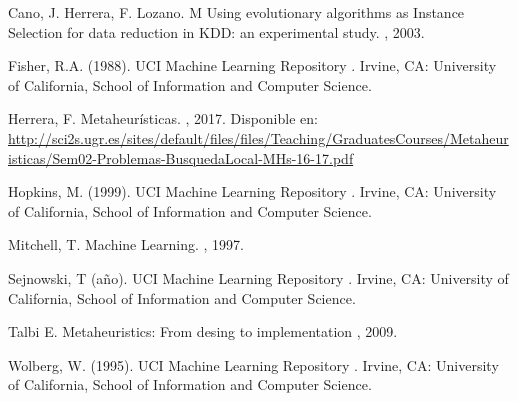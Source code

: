 \documentclass{ci5652}
\begin{document}

\small


\begin{thebibliography}{99}

Cano, J. Herrera, F. Lozano. M
\newblock Using evolutionary algorithms as Instance Selection for data
reduction in KDD: an experimental study.
, 2003.

Fisher, R.A. (1988). UCI Machine Learning Repository 
.
\newblock Irvine, CA: University of California, School of Information and Computer Science.

Herrera, F.
\newblock Metaheurísticas. 
, 2017. Disponible en: 
\url{http://sci2s.ugr.es/sites/default/files/files/Teaching/GraduatesCourses/Metaheuristicas/Sem02-Problemas-BusquedaLocal-MHs-16-17.pdf}

Hopkins, M. (1999). UCI Machine Learning Repository 
.
\newblock Irvine, CA: University of California, School of Information and Computer Science.

Mitchell, T.
\newblock Machine Learning.
, 1997.

Sejnowski, T (año). UCI Machine Learning Repository 
.
\newblock Irvine, CA: University of California, School of Information and Computer Science.

Talbi E.
\newblock Metaheuristics: From desing to implementation
, 2009.

Wolberg, W. (1995). UCI Machine Learning Repository 
.
\newblock Irvine, CA: University of California, School of Information and Computer Science.

%
\end{thebibliography}
\end{document}
